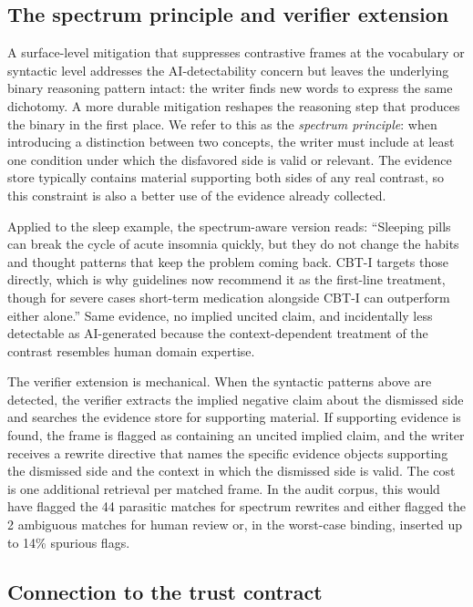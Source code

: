 \documentclass[11pt]{article}
\begin{document}
\subsection{The spectrum principle and verifier extension}
\label{sec:implied-mitigation}

A surface-level mitigation that suppresses contrastive frames at the
vocabulary or syntactic level addresses the AI-detectability concern but
leaves the underlying binary reasoning pattern intact: the writer finds new
words to express the same dichotomy. A more durable mitigation reshapes the
reasoning step that produces the binary in the first place. We refer to this
as the \emph{spectrum principle}: when introducing a distinction between two
concepts, the writer must include at least one condition under which the
disfavored side is valid or relevant. The evidence store typically contains
material supporting both sides of any real contrast, so this constraint is
also a better use of the evidence already collected.

Applied to the sleep example, the spectrum-aware version reads: ``Sleeping
pills can break the cycle of acute insomnia quickly, but they do not change
the habits and thought patterns that keep the problem coming back. CBT-I
targets those directly, which is why guidelines now recommend it as the
first-line treatment, though for severe cases short-term medication
alongside CBT-I can outperform either alone.'' Same evidence, no implied
uncited claim, and incidentally less detectable as AI-generated because the
context-dependent treatment of the contrast resembles human domain
expertise.

The verifier extension is mechanical. When the syntactic patterns above
are detected, the verifier extracts the implied negative claim about the
dismissed side and searches the evidence store for supporting material. If
supporting evidence is found, the frame is flagged as containing an uncited
implied claim, and the writer receives a rewrite directive that names the
specific evidence objects supporting the dismissed side and the context in
which the dismissed side is valid. The cost is one additional retrieval per
matched frame. In the audit corpus, this would have flagged the 44
parasitic matches for spectrum rewrites and either flagged the 2 ambiguous
matches for human review or, in the worst-case binding, inserted up to 14\%
spurious flags.

\subsection{Connection to the trust contract}
\label{sec:implied-contract}
\end{document}
